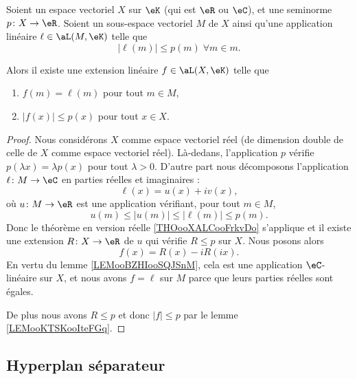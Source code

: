 \begin{theorem}		\label{THOooVQLJooWuBMoZ}
	Soient un espace vectoriel \( X\) sur \( \eK\) (qui est \( \eR\) ou \( \eC\)), et une seminorme \(p \colon X\to \eR  \). Soient un sous-espace vectoriel \( M\) de \( X\) ainsi qu'une application linéaire \( \ell\in\aL(M,\eK)\) telle que
	\begin{equation}
		| \ell(m) |\leq p(m)\;\forall m\in m.
	\end{equation}

	Alors il existe une extension linéaire \( f\in\aL(X,\eK)\) telle que
	\begin{enumerate}
		\item
		      \( f(m)=\ell(m)\) pour tout \( m\in M\),
		\item
		      \( | f(x) |\leq p(x)\) pour tout \( x\in X\).
	\end{enumerate}
\end{theorem}

\begin{proof}
	Nous considérons \( X\) comme espace vectoriel réel (de dimension double de celle de \( X\) comme espace vectoriel réel). Là-dedans, l'application \( p\) vérifie \( p(\lambda x)=\lambda p(x)\) pour tout \( \lambda>0\). D'autre part nous décomposons l'application \(\ell \colon M\to \eC  \) en parties réelles et imaginaires :
	\begin{equation}
		\ell(x)=u(x)+iv(x),
	\end{equation}
	où \(u \colon M\to \eR  \) est une application vérifiant, pour tout \( m\in M\),
	\begin{equation}
		u(m)\leq | u(m) |\leq | \ell(m) |\leq p(m).
	\end{equation}
	Donc le théorème en version réelle \ref{THOooXALCooFrkvDo} s'applique et il existe une extension \(R \colon X\to \eR  \) de \( u\) qui vérifie \( R\leq p\) sur \( X\). Nous posons alors
	\begin{equation}
		f(x)=R(x)-iR(ix).
	\end{equation}
	En vertu du lemme \ref{LEMooBZHIooSQJSnM}, cela est une application \( \eC\)-linéaire sur \( X\), et nous avons \( f=\ell\) sur \( M\) parce que leurs parties réelles sont égales.

	De plus nous avons \( R\leq p\) et donc \( | f |\leq p\) par le lemme \ref{LEMooKTSKooIteFGq}.
\end{proof}

\subsection{Hyperplan séparateur}

